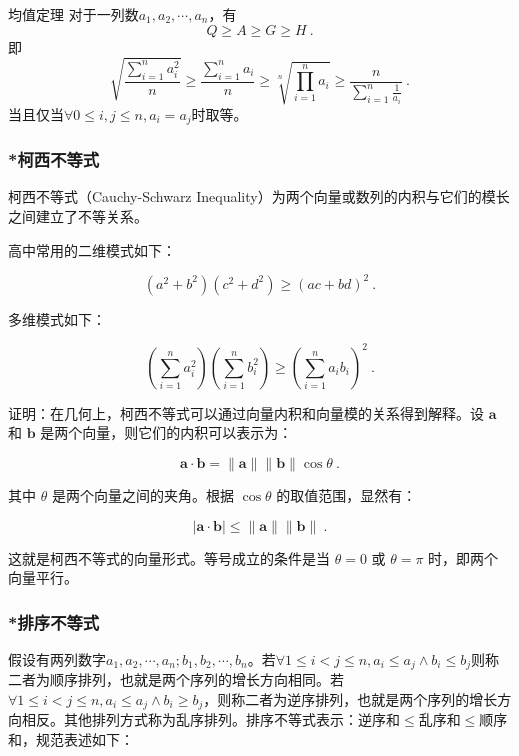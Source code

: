 \begin{theorem}{均值定理}
对于一列数$a_1,a_2,\cdots,a_n$，有
\begin{equation}
Q\geq A\geq G\geq H~.
\end{equation}
即
\begin{equation}
\displaystyle\sqrt{\frac{\displaystyle\sum_{i=1}^na_i^2}{n}}\geq \frac{\displaystyle\sum_{i=1}^na_i}{n}\geq \sqrt[n]{\prod_{i=1}^na_i}\geq \frac{n}{\displaystyle\sum_{i=1}^n\frac{1}{a_i}}~.
\end{equation}
当且仅当$\forall 0\leq i,j\leq n,a_i=a_j$时取等。
\end{theorem}


\subsubsection{*柯西不等式}

柯西不等式（Cauchy-Schwarz Inequality）为两个向量或数列的内积与它们的模长之间建立了不等关系。

高中常用的二维模式如下：

\begin{equation}
\left( a^2 + b^2\right) \left(c^2 + d^2 \right) \geq \left( ac+bd \right)^2~.
\end{equation}

多维模式如下：

\begin{equation}
\left( \sum_{i=1}^{n} a_i^2 \right) \left( \sum_{i=1}^{n} b_i^2 \right) \geq \left( \sum_{i=1}^{n} a_i b_i \right)^2~.
\end{equation}

证明：在几何上，柯西不等式可以通过向量内积和向量模的关系得到解释。设 $\mathbf{a}$ 和 $\mathbf{b}$ 是两个向量，则它们的内积可以表示为：

$$\mathbf{a} \cdot \mathbf{b} = \|\mathbf{a}\| \|\mathbf{b}\| \cos \theta~.$$

其中 $\theta$ 是两个向量之间的夹角。根据 $\cos \theta$ 的取值范围，显然有：

$$|\mathbf{a} \cdot \mathbf{b}| \leq \|\mathbf{a}\| \|\mathbf{b}\|~.$$

这就是柯西不等式的向量形式。等号成立的条件是当 $\theta = 0$ 或 $\theta = \pi$ 时，即两个向量平行。

\subsubsection{*排序不等式}

假设有两列数字$a_1,a_2,\cdots,a_n;b_1,b_2,\cdots,b_n$。若$\forall 1\leq i<j\leq n,a_i\leq a_j\land b_i\leq b_j$则称二者为顺序排列，也就是两个序列的增长方向相同。若$\forall 1\leq i<j\leq n,a_i\leq a_j\land b_i\geq b_j$，则称二者为逆序排列，也就是两个序列的增长方向相反。其他排列方式称为乱序排列。排序不等式表示：逆序和$\leq$乱序和$\leq$顺序和，规范表述如下：

